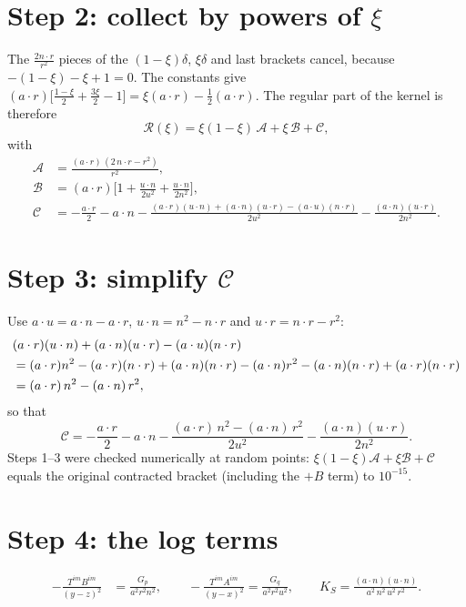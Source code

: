 \documentclass[10pt]{article}
\begin{document}
\section*{Step 2: collect by powers of $\xi$}
The $\frac{2n\cdot r}{r^{2}}$ pieces of the $(1-\xi)\delta$, $\xi\delta$ and last brackets cancel, because $-(1-\xi)-\xi+1=0$. The constants give $(a\cdot r)\big[\frac{1-\xi}{2}+\frac{3\xi}{2}-1\big]=\xi(a\cdot r)-\frac12(a\cdot r)$. The regular part of the kernel is therefore
\begin{equation}
\mathcal{R}(\xi)=\xi(1-\xi)\,\mathcal{A}+\xi\,\mathcal{B}+\mathcal{C},
\end{equation}
with
\begin{align}
\mathcal{A}&=\frac{(a\cdot r)\,(2\,n\cdot r-r^{2})}{r^{2}},\\
\mathcal{B}&=(a\cdot r)\Big[1+\frac{u\cdot n}{2u^{2}}+\frac{u\cdot n}{2n^{2}}\Big],\\
\mathcal{C}&=-\frac{a\cdot r}{2}-a\cdot n-\frac{(a\cdot r)(u\cdot n)+(a\cdot n)(u\cdot r)-(a\cdot u)(n\cdot r)}{2u^{2}}-\frac{(a\cdot n)(u\cdot r)}{2n^{2}} .
\end{align}

\section*{Step 3: simplify $\mathcal{C}$}
Use $a\cdot u=a\cdot n-a\cdot r$, $u\cdot n=n^{2}-n\cdot r$ and $u\cdot r=n\cdot r-r^{2}$:
\begin{align}
&(a\cdot r)(u\cdot n)+(a\cdot n)(u\cdot r)-(a\cdot u)(n\cdot r)\notag\\
&=(a\cdot r)n^{2}-(a\cdot r)(n\cdot r)+(a\cdot n)(n\cdot r)-(a\cdot n)r^{2}-(a\cdot n)(n\cdot r)+(a\cdot r)(n\cdot r)\notag\\
&=(a\cdot r)\,n^{2}-(a\cdot n)\,r^{2},
\end{align}
so that
\begin{equation}
\mathcal{C}=-\frac{a\cdot r}{2}-a\cdot n-\frac{(a\cdot r)\,n^{2}-(a\cdot n)\,r^{2}}{2u^{2}}-\frac{(a\cdot n)(u\cdot r)}{2n^{2}} .
\end{equation}
Steps 1--3 were checked numerically at random points: $\xi(1-\xi)\mathcal{A}+\xi\mathcal{B}+\mathcal{C}$ equals the original contracted bracket (including the $+B$ term) to $10^{-15}$.

\section*{Step 4: the log terms}
\begin{align}
-\frac{T^{im}B^{im}}{(y-z)^{2}}&=\frac{G_{p}}{a^{2}r^{2}n^{2}},\qquad -\frac{T^{im}A^{im}}{(y-x)^{2}}=\frac{G_{q}}{a^{2}r^{2}u^{2}},\qquad
K_{S}=\frac{(a\cdot n)(u\cdot n)}{a^{2}\,n^{2}\,u^{2}\,r^{2}} .
\end{align}
\end{document}

